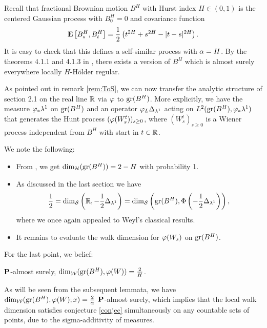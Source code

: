 Recall that fractional Brownian motion $B^H$ with Hurst index $H\in(0,1)$ is the centered Gaussian process with $B^H_0=0$ and covariance function
\[
  \mathbf{E}\left[{B^H_s,B^H_t}\right]=\frac{1}{2}\left(t^{2H}+s^{2H}-|t-s|^{2H}\right).
\]
It is easy to check that this defines a self-similar process with 
$\alpha=H$. By the theorems 4.1.1 and 4.1.3 in \cite{embrechts2002selfsimilar}, there exists a version of $B^H$ which is almost surely everywhere locally $H$-H\"older regular. 

As pointed out in remark \ref{rem:ToS}, we can now transfer the analytic structure of section 2.1 on the real line $\mathbb{R}$ via $\varphi$ to 
$\operatorname{gr}(B^H)$. More explicitly, we have the measure $\varphi_*\lambda^1$ on $\operatorname{gr}(B^H)$ and an operator $\varphi_L\Delta_{\lambda^1}$ acting on $L^2(\operatorname{gr}(B^H),\varphi_*\lambda^1)$ that generates the Hunt process $(\varphi(W_s^t))_{s\geq0}$, where $(W_s^t)_{s\geq0}$ is a Wiener process independent from $B^H$ with start in $t\in\mathbb{R}$.

We note the following:
\begin{itemize}
  \item From \cite{ayache2004hausdorff}, we get $\dim_{\mathcal{H}}(\operatorname{gr}(B^H))=2-H$ with probability 1.  
  \item As discussed in the last section we have
  \[
    \frac{1}{2}=\dim_{\mathcal{S}}\left(\mathbb{R},-\frac{1}{2}\Delta_{\lambda^1}\right)
    =\dim_{\mathcal{S}}\left(\operatorname{gr}(B^H),\Phi \left(-\frac{1}{2}\Delta_{\lambda^1}\right)\right),
  \]
  where we once again appealed to Weyl's classical results. 
  \item It remains to evaluate the walk dimension for $\varphi(W_s)$ on 
  $\operatorname{gr}(B^H)$.
\end{itemize}
For the last point, we belief:
\begin{conjec}\label{conjec}
  $\mathbf{P}$-almost surely, $\dim_{\mathcal{W}}(\operatorname{gr}(B^H),\varphi(W))=\frac{2}{H}$. 
\end{conjec}
As will be seen from the subsequent lemmata, we have 
$\dim_{\mathcal{W}}(\operatorname{gr}(B^H),\varphi(W);x)=\frac{2}{\alpha}$ $\mathbf{P}$-almost surely, which implies that the local walk dimension satisfies conjecture \ref{conjec} simultaneously on any countable sets of points, due to the sigma-additivity of measures. 

